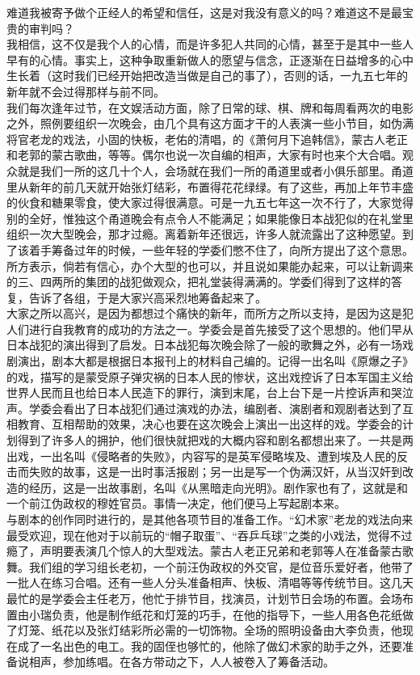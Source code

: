 难道我被寄予做个正经人的希望和信任，这是对我没有意义的吗？难道这不是最宝贵的审判吗？\\

我相信，这不仅是我个人的心情，而是许多犯人共同的心情，甚至于是其中一些人早有的心情。事实上，这种争取重新做人的愿望与信念，正逐渐在日益增多的心中生长着（这时我们已经开始把改造当做是自己的事了），否则的话，一九五七年的新年就不会过得那样与前不同。\\

我们每次逢年过节，在文娱活动方面，除了日常的球、棋、牌和每周看两次的电影之外，照例要组织一次晚会，由几个具有这方面才干的人表演一些小节目，如伪满将官老龙的戏法，小固的快板，老佑的清唱，的《萧何月下追韩信》，蒙古人老正和老郭的蒙古歌曲，等等。偶尔也说一次自编的相声，大家有时也来个大合唱。观众就是我们一所的这几十个人，会场就在我们一所的甬道里或者小俱乐部里。甬道里从新年的前几天就开始张灯结彩，布置得花花绿绿。有了这些，再加上年节丰盛的伙食和糖果零食，使大家过得很满意。可是一九五七年这一次不行了，大家觉得别的全好，惟独这个甬道晚会有点令人不能满足；如果能像日本战犯似的在礼堂里组织一次大型晚会，那才过瘾。离着新年还很远，许多人就流露出了这种愿望。到了该着手筹备过年的时候，一些年轻的学委们憋不住了，向所方提出了这个意思。所方表示，倘若有信心，办个大型的也可以，并且说如果能办起来，可以让新调来的三、四两所的集团的战犯做观众，把礼堂装得满满的。学委们得到了这样的答复，告诉了各组，于是大家兴高采烈地筹备起来了。\\

大家之所以高兴，是因为都想过个痛快的新年，而所方之所以支持，是因为这是犯人们进行自我教育的成功的方法之一。学委会是首先接受了这个思想的。他们早从日本战犯的演出得到了启发。日本战犯每次晚会除了一般的歌舞之外，必有一场戏剧演出，剧本大都是根据日本报刊上的材料自己编的。记得一出名叫《原爆之子》的戏，描写的是蒙受原子弹灾祸的日本人民的惨状，这出戏控诉了日本军国主义给世界人民而且也给日本人民造下的罪行，演到末尾，台上台下是一片控诉声和哭泣声。学委会看出了日本战犯们通过演戏的办法，编剧者、演剧者和观剧者达到了互相教育、互相帮助的效果，决心也要在这次晚会上演出一出这样的戏。学委会的计划得到了许多人的拥护，他们很快就把戏的大概内容和剧名都想出来了。一共是两出戏，一出名叫《侵略者的失败》，内容写的是英军侵略埃及、遭到埃及人民的反击而失败的故事，这是一出时事活报剧；另一出是写一个伪满汉奸，从当汉奸到改造的经历，这是一出故事剧，名叫《从黑暗走向光明》。剧作家也有了，这就是和一个前江伪政权的穆姓官员。事情一决定，他们便马上写起剧本来。\\

与剧本的创作同时进行的，是其他各项节目的准备工作。“幻术家”老龙的戏法向来最受欢迎，现在他对于以前玩的“帽子取蛋”、“吞乒乓球”之类的小戏法，觉得不过瘾了，声明要表演几个惊人的大型戏法。蒙古人老正兄弟和老郭等人在准备蒙古歌舞。我们组的学习组长老初，一个前汪伪政权的外交官，是位音乐爱好者，他带了一批人在练习合唱。还有一些人分头准备相声、快板、清唱等等传统节目。这几天最忙的是学委会主任老万，他忙于排节目，找演员，计划节日会场的布置。会场布置由小瑞负责，他是制作纸花和灯笼的巧手，在他的指导下，一些人用各色花纸做了灯笼、纸花以及张灯结彩所必需的一切饰物。全场的照明设备由大李负责，他现在成了一名出色的电工。我的固侄也够忙的，他除了做幻术家的助手之外，还要准备说相声，参加练唱。在各方带动之下，人人被卷入了筹备活动。\\

